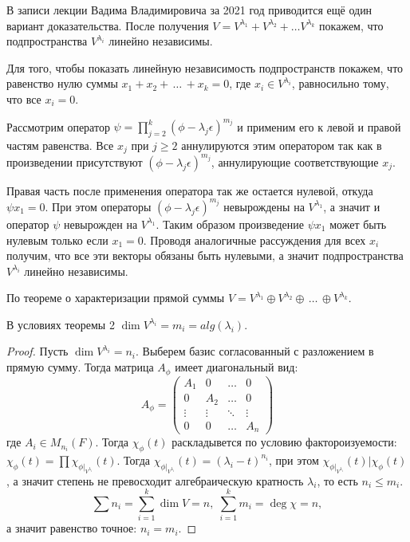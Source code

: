 \begin{remarkfrom}
    В записи лекции Вадима Владимировича за 2021 год приводится ещё один вариант доказательства. 
    После получения $V = V^{\lambda_1} + V^{\lambda_2} + \dots V^{\lambda_k}$ покажем, что подпространства 
    $V^{\lambda_i}$ линейно независимы.

    Для того, чтобы показать линейную независимость подпространств покажем, что равенство нулю суммы 
    $x_1 + x_2 + \, \dots \, + x_k = 0$, где $x_i \in V^{\lambda_i}$, равносильно тому, что все $x_i = 0$.

    Рассмотрим оператор $\psi = \displaystyle\prod_{j = 2}^{k} (\phi - \lambda_j \epsilon)^{m_j}$ и применим его 
    к левой и правой частям равенства. Все $x_j$ при $j \geq 2$ аннулируются этим оператором так как 
    в произведении присутствуют $(\phi - \lambda_j \epsilon)^{m_j}$, аннулирующие соответствующие $x_j$.

    Правая часть после применения оператора так же остается нулевой, откуда $\psi x_1 = 0$.
    При этом операторы $(\phi - \lambda_j \epsilon)^{m_j}$ невырождены на $V^{\lambda_1}$,  а значит 
    и оператор $\psi$ невырожден на $V^{\lambda_1}$. Таким образом произведение $\psi x_1$ может быть 
    нулевым только если $x_1 = 0$. Проводя аналогичные рассуждения для всех $x_i$ получим, что 
    все эти векторы обязаны быть нулевыми, а значит подпространства $V^{\lambda_i}$ линейно независимы.

    По теореме о характеризации прямой суммы $V = V^{\lambda_1} \oplus V^{\lambda_2} \oplus \, \dots \, \oplus V^{\lambda_k}.$
\end{remarkfrom}

\begin{corollary}
    В условиях теоремы 2 $\dim V^{\lambda_i} = m_i = alg(\lambda_i)$.
\end{corollary}

\begin{proof}
    Пусть $\dim V^{\lambda_i} = n_i$. Выберем базис согласованный с разложением в прямую сумму. 
    Тогда матрица $A_{\phi}$ имеет диагональный вид:
    \[A_{\phi} = \begin{pmatrix}
		A_1    & 0      & \dots  & 0\\
		0      & A_2    & \dots  & 0\\
		\vdots & \vdots & \ddots & \vdots\\
		0      & 0      & \dots  & A_n
	\end{pmatrix}\]
    где $A_i \in M_{n_i}(F)$. 
    Тогда $\chi_{\phi} (t)$ раскладывется по условию фактороизуемости: 
    $\chi_{\phi} (t) = \prod \chi_{\phi \vert_{V^{\lambda_i}}} (t)$.
    Тогда $\chi_{\phi \vert_{V^{\lambda_i}}} (t) = (\lambda_i - t)^{n_i}$, при этом
    $\chi_{\phi \vert_{V^{\lambda_i}}} (t) \vert \chi_{\phi} (t)$, а значит степень 
    не превосходит алгебраическую кратность $\lambda_i$, то есть $n_i \leq m_i$.
    $$\sum n_i = \displaystyle\sum_{i = 1}^{k} \dim V = n, \; 
    \displaystyle\sum_{i = 1}^{k} m_i = \deg \chi = n,$$ 
    а значит равенство точное: $n_i = m_i$.
\end{proof}

